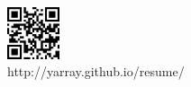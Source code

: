 \begin{nospace}
\begin{flushleft}
\vspace{-2.5em}
\includegraphics[width=0.6in]{qr.eps}\\
\small{http://yarray.github.io/resume/}\\
\end{flushleft}
\end{nospace}
